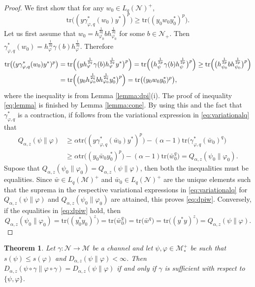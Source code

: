 \documentclass[12pt]{article}
\newtheorem{theorem}{Theorem}[section]
\theoremstyle{definition}
\theoremstyle{remark}
\numberwithin{equation}{section}
\def\Me{\mathcal M}
\def\Ne{\mathcal N}
\def\Tr{\mathrm{tr}}
\def\ffi{\varphi}
\begin{document}
\begin{proof} We first show that  for any $w_0\in L_q(\Ne)^+$,
\begin{equation}\label{eq:lemma}
\Tr\bigl((y\gamma^*_{\ffi,q}(w_0)y^*)^p\bigr)\ge
\Tr\bigl((y_0w_0y_0^*)^p\bigr).
\end{equation}
Let us first assume that
$w_0=h_{\varphi_0}^{\frac1{2q}}bh_{\varphi_0}^{\frac1{2q}}$ for some $b\in \Ne_+$. Then 
$\gamma^*_{\varphi,q}(w_0)=h_{\varphi}^{\frac1{2q}}\gamma(b)h_{\varphi}^{\frac1{2q}}$.
Therefore
\begin{align*}
\Tr\bigl((y\gamma^*_{\varphi,q}(w_0)y^*)^p\bigr)
&=\Tr\Bigl(\bigl(yh_{\varphi}^{\frac1{2q}}\gamma(b)h_{\varphi}^{\frac1{2q}}y^*\bigr)^p\Bigr)=
\Tr\Bigl(\bigl(h_\psi^{\frac1{2p}}\gamma(b)h_\psi^{\frac1{2p}}\bigr)^p\Bigr)\ge
\Tr\Bigl(\bigl(h_{\psi_0}^{\frac1{2p}}bh_{\psi_0}^{\frac1{2p}}\bigr)^p\Bigr)\\
&=\Tr\Bigl(\bigl(y_0h_{\varphi_0}^{\frac1{2q}}bh_{\varphi_0}^{\frac1{2q}}y_0^*\bigr)^p\Bigr)
=\Tr\bigl((y_0w_0y_0^*)^p\bigr),
\end{align*}
where the inequality is from Lemma \ref{lemma:dpi}(i). The proof of inequality
\eqref{eq:lemma} is  finished  by Lemma \ref{lemma:cone}.
By using this and the fact that $\gamma^*_{\ffi,q}$ is a contraction, if follows from the variational
expression in \eqref{eq:variationalq} that
\begin{align*}
Q_{\alpha,z}(\psi\|\varphi)
&\ge \alpha\Tr\bigl((y\gamma^*_{\varphi,q}(\bar w_0)y^*)^p\bigr)-
(\alpha-1)\Tr\bigl(\gamma^*_{\varphi,q}(\bar w_0)^q\bigr)\\
&\ge \alpha\Tr\bigr((y_0\bar w_0 y_0^*)^p\bigr)-(\alpha-1)\Tr\bigl(\bar
w_0^q\bigr)=Q_{\alpha,z}(\psi_0\|\varphi_0).
\end{align*}
Supose that $Q_{\alpha,z}(\psi_0\|\varphi_0)=Q_{\alpha,z}(\psi\|\varphi)$, then both the
inequalities must be equalities. Since $\bar
w\in L_q(\Me)^+$ and $\bar w_0\in L_q(\Ne)^+$ are the unique elements such that the suprema
in the {respective} variational expressions in \eqref{eq:variationalq} for
$Q_{\alpha,z}(\psi\|\varphi)$ and $Q_{\alpha,z}(\psi_0\|\varphi_0)$ are attained, this proves
\eqref{eq:dpiw}. Conversely, if the equalities in \eqref{eq:dpiw} hold, then
\[
Q_{\alpha,z}(\psi_0\|\ffi_0)=\Tr\bigl((y_0^*y_0)^z\bigr)=\Tr\bigl(\bar w_0^q\bigr)
=\Tr\bigl(\bar w^q\bigr)=\Tr\bigl((y^*y)^z\bigr)=Q_{\alpha,z}(\psi\|\ffi).
\]
\end{proof}


\begin{theorem}\label{thm:suffge1}
Let $\gamma:\Ne\to \Me$ be a channel and let $\psi,\varphi\in \Me_*^+$ be such that 
$s(\psi)\le s(\ffi)$ and $D_{\alpha,z}(\psi\|\varphi)<\infty$. Then
$D_{\alpha,z}(\psi\circ\gamma\|\ffi\circ\gamma)=D_{\alpha,z}(\psi\|\varphi)$ if and only if
$\gamma$ is sufficient with respect to $\{\psi,\ffi\}$.

\end{theorem}
\end{document}
